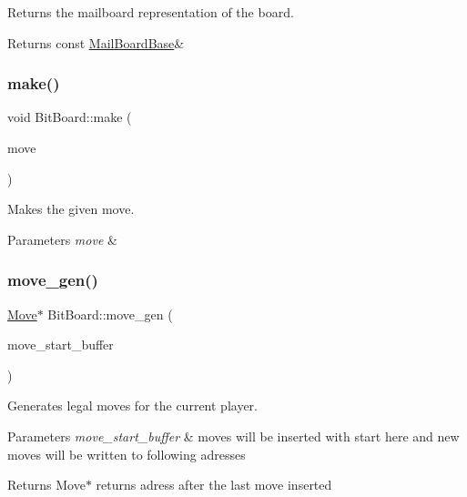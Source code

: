 Returns the mailboard representation of the board. 

\begin{DoxyReturn}{Returns}
const \hyperlink{structMailBoardBase}{Mail\+Board\+Base}\& 
\end{DoxyReturn}
\mbox{\label{classBitBoard_ad6a94224aa19bc86bbb14969d09a55e6}} 
\subsubsection{\texorpdfstring{make()}{make()}}
{\footnotesize\ttfamily void Bit\+Board\+::make (\begin{DoxyParamCaption}\item[{\hyperlink{structMove}{Move}}]{move }\end{DoxyParamCaption})\hspace{0.3cm}{\ttfamily [inline]}}



Makes the given move. 


\begin{DoxyParams}{Parameters}
{\em move} & \\
\hline
\end{DoxyParams}
\mbox{\label{classBitBoard_a5ce954a262cf51bee94d1508b9002464}} 
\subsubsection{\texorpdfstring{move\+\_\+gen()}{move\_gen()}}
{\footnotesize\ttfamily \hyperlink{structMove}{Move}$\ast$ Bit\+Board\+::move\+\_\+gen (\begin{DoxyParamCaption}\item[{\hyperlink{structMove}{Move} $\ast$}]{move\+\_\+start\+\_\+buffer }\end{DoxyParamCaption})\hspace{0.3cm}{\ttfamily [inline]}}



Generates legal moves for the current player. 


\begin{DoxyParams}{Parameters}
{\em move\+\_\+start\+\_\+buffer} & moves will be inserted with start here and new moves will be written to following adresses \\
\hline
\end{DoxyParams}
\begin{DoxyReturn}{Returns}
Move$\ast$ returns adress after the last move inserted 
\end{DoxyReturn}
\mbox{\label{classBitBoard_ae16917d3f752d11e5f689228d87bcf29}} 
